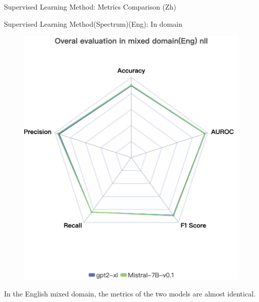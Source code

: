 \documentclass[serif]{beamer}
\begin{document}
\begin{frame}{Supervised Learning Method: Metrics Comparison (Zh)}
\vspace{0.2cm}
{\scriptsize {}}

\end{frame}

\begin{frame}{Supervised Learning Method(Spectrum)(Eng): In domain}
    \begin{figure}
        \centering
        \includegraphics[width=0.5\linewidth]{images/Overal evaluation in mixed domain(Eng) nll.png}
        \label{fig:enter-label}
    \end{figure}
    \vspace{-0.2em}
\begin{flushleft}
\scriptsize
In the English mixed domain, the metrics of the two models are almost identical.
\normalize
\end{flushleft}
\end{frame}
\end{document}
